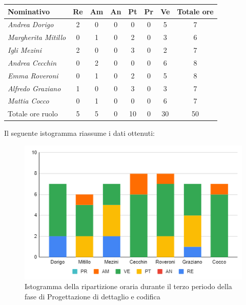 {{{{{{{{{{{{{{		\begin{center}
			\renewcommand{\arraystretch}{1.4}
			\begin{tabularx}{\textwidth}{|X|c|c|c|c|c|c|c|}
				\hline
				\rowcolor{airforceblue}
				\textbf{Nominativo} & \textbf{Re} & \textbf{Am} & \textbf{An} & \textbf{Pt} & \textbf{Pr} & \textbf{Ve} & \textbf{Totale ore}\\
				\hline
				\textit{Andrea Dorigo} & 2 & 0 & 0 & 0 & 0 & 5 & 7\\
				\hline
				\textit{Margherita Mitillo} & 0 & 1 & 0 & 2 & 0 & 3 & 6\\
				\hline
				\textit{Igli Mezini} & 2 & 0 & 0 & 3 & 0 & 2 & 7\\
				\hline
				\textit{Andrea Cecchin} & 0 & 2 & 0 & 0 & 0 & 6 & 8\\
				\hline
				\textit{Emma Roveroni} & 0 & 1 & 0 & 2 & 0 & 5 & 8\\
				\hline
				\textit{Alfredo Graziano} & 1 & 0 & 0 & 3 & 0 & 3 & 7\\
				\hline
				\textit{Mattia Cocco} & 0 & 1 & 0 & 0 & 0 & 6 & 7\\
				\hline
				Totale ore ruolo & 5 & 5 & 0 & 10 & 0 & 30 & 50\\
				\hline
			\end{tabularx}
		\end{center}
		Il seguente istogramma riassume i dati ottenuti:
		\begin{figure}[!h]
			\begin{center}
				\includegraphics[width=0.7\linewidth]{../immagini/pdp/istogramma_progettazione_dettaglio_periodo3.png}
				\caption{Istogramma della ripartizione oraria durante il terzo periodo della fase di Progettazione di
					dettaglio e codifica}
			\end{center}
		\end{figure}
		\clearpage
}}}}}}}}}}}}}}
